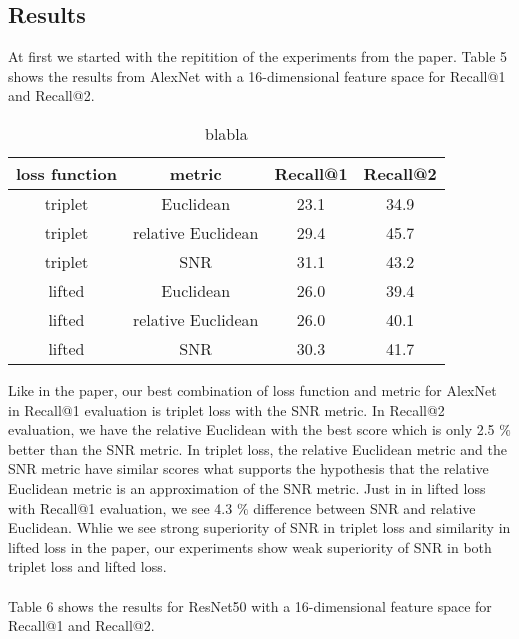 \documentclass[12pt,paper=a4]{scrartcl}
\theoremstyle{break}
\begin{document}
\subsection{Results}
At first we started with the repitition of the experiments from the paper. Table 5 shows the results from AlexNet with a 16-dimensional feature space for Recall@1 and Recall@2.
\begin{table}[h]
\centering
  \begin{tabular}{| c | c | c | c |}
    \hline
     loss function & metric & Recall@1 & Recall@2 \\ \hline \hline
    triplet & Euclidean & 23.1 & 34.9 \\ \hline
    triplet & relative Euclidean & 29.4 & 45.7 \\ \hline
    triplet & SNR & 31.1 & 43.2 \\ \hline
    lifted & Euclidean & 26.0 & 39.4 \\ \hline
    lifted & relative Euclidean & 26.0 & 40.1 \\ \hline
    lifted & SNR & 30.3 & 41.7 \\
    \hline
  \end{tabular}
  \caption{blabla}
\end{table}
Like in the paper, our best combination of loss function and metric for AlexNet in Recall@1 evaluation is triplet loss with the SNR metric. In Recall@2 evaluation, we have the relative Euclidean with the best score which is only 2.5 $\%$ better than the SNR metric. In triplet loss, the relative Euclidean metric and the SNR metric have similar scores what supports the hypothesis that the relative Euclidean metric is an approximation of the SNR metric. Just in in lifted loss with Recall@1 evaluation, we see 4.3 $\%$ difference between SNR and relative Euclidean. Whlie we see strong superiority of SNR in triplet loss and similarity in lifted loss in the paper, our experiments show weak superiority of SNR in both triplet loss and lifted loss. \\ \\
Table 6 shows the results for ResNet50 with a 16-dimensional feature space for Recall@1 and Recall@2.
\end{document}
